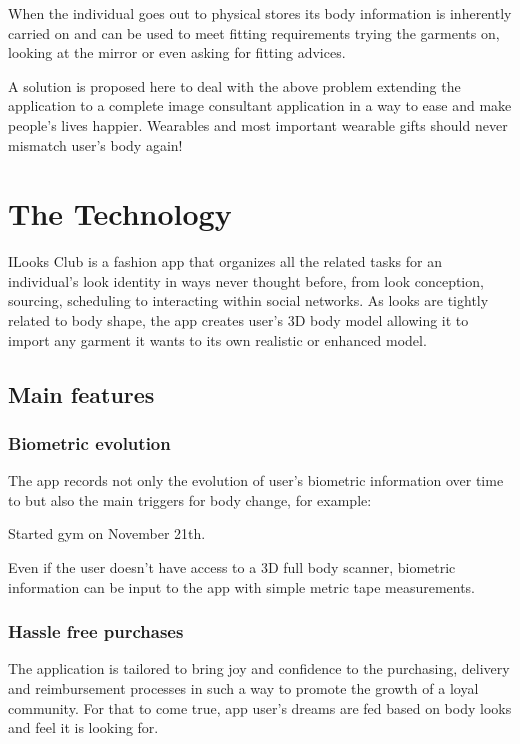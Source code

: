 \documentclass[twoside,twocolumn]{article}
\begin{document}
When the individual goes out to physical stores its body information is
inherently carried on and can be used to meet fitting requirements trying the
garments on, looking at the mirror or even asking for fitting advices.

A solution is proposed here to deal with the above problem extending the
application to a complete image consultant application in a way to ease and make
people's lives happier. Wearables and most important wearable gifts should never
mismatch user's body again!


\cite{kurzweil2000age}

\section{The Technology}

ILooks Club is a fashion app that organizes all the related tasks for an
individual's look identity in ways never thought before, from look conception,
sourcing, scheduling to interacting within social networks. As looks are tightly
related to body shape, the app creates user's 3D body model allowing it to
import any garment it wants to its own realistic or enhanced model.

\subsection{Main features}

\subsubsection{Biometric evolution}

The app records not only the evolution of user's biometric information over time
to but also the main triggers for body change, for example:

Started gym on November 21th.

Even if the user doesn't have access to a 3D full body scanner, biometric
information can be input to the app with simple metric tape measurements.


\subsubsection{Hassle free purchases}

The application is tailored to bring joy and confidence to the purchasing,
delivery and reimbursement processes in such a way to promote the growth of a
loyal community. For that to come true, app user's dreams are fed based on body
looks and feel it is looking for.
\end{document}
